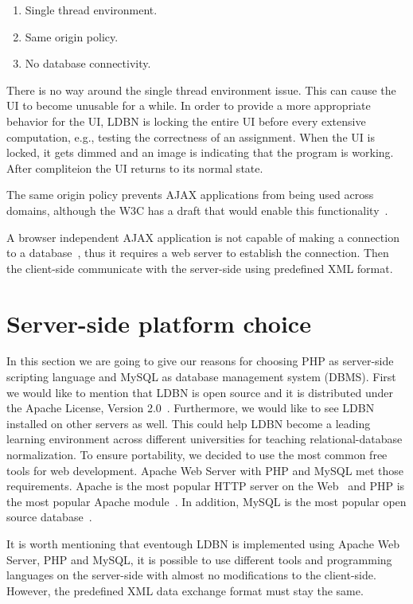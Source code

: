 \begin{enumerate}
	\item Single thread environment.
	\item Same origin policy.
	\item No database connectivity.
\end{enumerate}

There is no way around the single thread environment issue. This can cause the UI
to become unusable for a while. In order to provide a more appropriate behavior 
for the UI, LDBN is locking the entire UI before every extensive computation, e.g.,
testing the correctness of an assignment. When the UI is locked,
it gets dimmed and an image is indicating that the program is working. After 
compliteion the UI returns to its normal state. 

The same origin policy prevents AJAX applications from being used across domains,
although the W3C has a draft that would enable this functionality~\cite{bajax1}.

A browser independent AJAX application is not capable of making a connection 
to a database~\cite{bajax1}, thus it requires a web server to establish the 
connection. Then the client-side communicate with the server-side using 
predefined XML format.

\section{Server-side platform choice}
In this section we are going to give our reasons for choosing PHP as server-side
scripting language and MySQL as database management system (DBMS). First we would
like to mention that LDBN is open source and it is distributed under the 
Apache License, Version 2.0~\cite{walv2}. Furthermore, we would like to see 
LDBN installed on other servers as well. This could help LDBN become
a leading learning environment across 
different universities for teaching relational-database normalization. To ensure 
portability, we decided to use the most common free 
tools for web development. Apache Web Server with PHP and MySQL met those requirements. 
Apache is the most popular HTTP server on the Web~\cite{w3} and PHP is the most popular 
Apache module~\cite{w4}. In addition, MySQL is the most popular open source 
database~\cite{w5}.
 
It is worth mentioning that eventough LDBN is implemented using Apache Web Server,
PHP and MySQL, it is possible to use different tools and programming languages 
on the server-side with almost no modifications to the client-side. However, 
the predefined XML data exchange format must stay the same.

